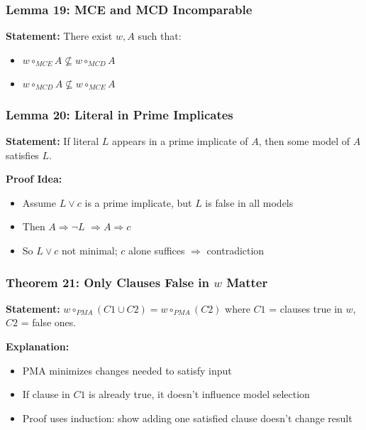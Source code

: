 \documentclass{beamer}
\begin{document}
\begin{frame}
\frametitle{Lemma 19: MCE and MCD Incomparable}
\textbf{Statement:} There exist $w, A$ such that:
\begin{itemize}
\item $w \circ_{MCE} A \not\subseteq w \circ_{MCD} A$
\item $w \circ_{MCD} A \not\subseteq w \circ_{MCE} A$
\end{itemize}

\end{frame}

\begin{frame}
\frametitle{Lemma 20: Literal in Prime Implicates}
\textbf{Statement:} If literal $L$ appears in a prime implicate of $A$, then some model of $A$ satisfies $L$.

\textbf{Proof Idea:}
\begin{itemize}
\item Assume $L \lor c$ is a prime implicate, but $L$ is false in all models
\item Then $A \Rightarrow \neg L$ $\Rightarrow A \Rightarrow c$
\item So $L \lor c$ not minimal; $c$ alone suffices $\Rightarrow$ contradiction
\end{itemize}
\end{frame}

\begin{frame}
\frametitle{Theorem 21: Only Clauses False in $w$ Matter}
\textbf{Statement:} $w \circ_{PMA}(C1 \cup C2) = w \circ_{PMA}(C2)$ where $C1$ = clauses true in $w$, $C2$ = false ones.

\textbf{Explanation:}
\begin{itemize}
\item PMA minimizes changes needed to satisfy input
\item If clause in $C1$ is already true, it doesn’t influence model selection
\item Proof uses induction: show adding one satisfied clause doesn't change result
\end{itemize}
\end{frame}
\end{document}
